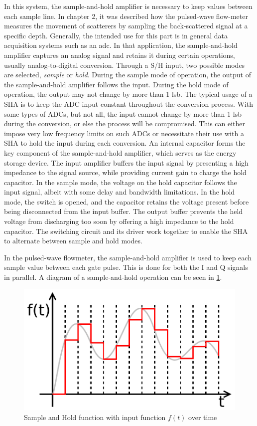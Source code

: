 In this system, the sample-and-hold amplifier is necessary to keep values between each sample line. In chapter 2, it was described how the pulsed-wave flow-meter measures the movement of scatterers by sampling the back-scattered signal at a specific depth. Generally, the intended use for this part is in general data acquisition systems such as an \gls{adc}. In that application, the sample-and-hold amplifier captures an analog signal and retains it during certain operations, usually analog-to-digital conversion. Through a S/H input, two possible modes are selected, \textit{sample} or \textit{hold}. During the sample mode of operation, the output of the sample-and-hold amplifier follows the input. During the hold mode of operation, the output may not change by more than 1 \gls{lsb}. The typical usage of a SHA is to keep the ADC input constant throughout the conversion process. With some types of ADCs, but not all, the input cannot change by more than 1 \gls{lsb} during the conversion, or else the process will be compromised. This can either impose very low frequency limits on such ADCs or necessitate their use with a SHA to hold the input during each conversion. An internal capacitor forms the key component of the sample-and-hold amplifier, which serves as the energy storage device. The input amplifier buffers the input signal by presenting a high impedance to the signal source, while providing current gain to charge the hold capacitor. In the sample mode, the voltage on the hold capacitor follows the input signal, albeit with some delay and bandwidth limitations. In the hold mode, the switch is opened, and the capacitor retains the voltage present before being disconnected from the input buffer. The output buffer prevents the held voltage from discharging too soon by offering a high impedance to the hold capacitor. The switching circuit and its driver work together to enable the SHA to alternate between sample and hold modes.

In the pulsed-wave flowmeter, the sample-and-hold amplifier is used to keep each sample value between each gate pulse. This is done for both the I and Q signals in parallel. A diagram of a sample-and-hold operation can be seen in \cref{fig:3_sha_function}.

\begin{figure}[htbp]
	\centering
	\includegraphics[width=.8\textwidth]{Figures/3_sample_hold_amplifier_quantization.pdf}
	\caption{Sample and Hold function with input function $f(t)$ over time \cite{sha_pic}}
	\label{fig:3_sha_function}
\end{figure}

